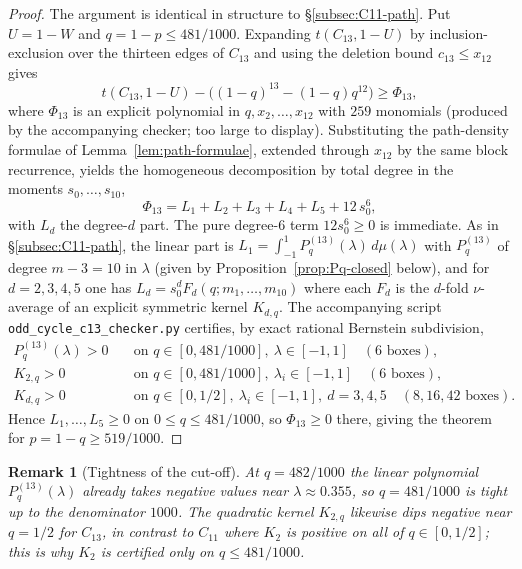 \documentclass[11pt]{article}
\newtheorem{remark}[theorem]{Remark}
\begin{document}
\begin{proof}
The argument is identical in structure to \S\ref{subsec:C11-path}.  Put $U=1-W$ and $q=1-p\le 481/1000$.  Expanding $t(C_{13},1-U)$ by inclusion-exclusion over the thirteen edges of $C_{13}$ and using the deletion bound $c_{13}\le x_{12}$ gives
\[
        t(C_{13},1-U)-\bigl((1-q)^{13}-(1-q)q^{12}\bigr)\ge\Phi_{13},
\]
where $\Phi_{13}$ is an explicit polynomial in $q,x_2,\ldots,x_{12}$ with $259$ monomials (produced by the accompanying checker; too large to display).  Substituting the path-density formulae of Lemma~\ref{lem:path-formulae}, extended through $x_{12}$ by the same block recurrence, yields the homogeneous decomposition by total degree in the moments $s_0,\ldots,s_{10}$,
\begin{equation}\label{eq:Phi13-decomp}
        \Phi_{13}=L_1+L_2+L_3+L_4+L_5+12\,s_0^6,
\end{equation}
with $L_d$ the degree-$d$ part.  The pure degree-$6$ term $12s_0^6\ge0$ is immediate.  As in \S\ref{subsec:C11-path}, the linear part is $L_1=\int_{-1}^1 P_q^{(13)}(\lambda)\,d\mu(\lambda)$ with $P_q^{(13)}$ of degree $m-3=10$ in $\lambda$ (given by Proposition~\ref{prop:Pq-closed} below), and for $d=2,3,4,5$ one has $L_d=s_0^d F_d(q;m_1,\ldots,m_{10})$ where each $F_d$ is the $d$-fold $\nu$-average of an explicit symmetric kernel $K_{d,q}$.  The accompanying script \texttt{odd\_cycle\_c13\_checker.py} certifies, by exact rational Bernstein subdivision,
\begin{align*}
P_q^{(13)}(\lambda)>0 &\quad\text{on }q\in[0,481/1000],\ \lambda\in[-1,1] \quad(6\text{ boxes}),\\
K_{2,q}>0 &\quad\text{on }q\in[0,481/1000],\ \lambda_i\in[-1,1] \quad(6\text{ boxes}),\\
K_{d,q}>0 &\quad\text{on }q\in[0,1/2],\ \lambda_i\in[-1,1],\ d=3,4,5 \quad(8,16,42\text{ boxes}).
\end{align*}
Hence $L_1,\ldots,L_5\ge0$ on $0\le q\le481/1000$, so $\Phi_{13}\ge0$ there, giving the theorem for $p=1-q\ge519/1000$.
\end{proof}

\begin{remark}[Tightness of the cut-off]
At $q=482/1000$ the linear polynomial $P_q^{(13)}(\lambda)$ already takes negative values near $\lambda\approx0.355$, so $q=481/1000$ is tight up to the denominator $1000$.  The quadratic kernel $K_{2,q}$ likewise dips negative near $q=1/2$ for $C_{13}$, in contrast to $C_{11}$ where $K_2$ is positive on all of $q\in[0,1/2]$; this is why $K_2$ is certified only on $q\le481/1000$.
\end{remark}
\end{document}
